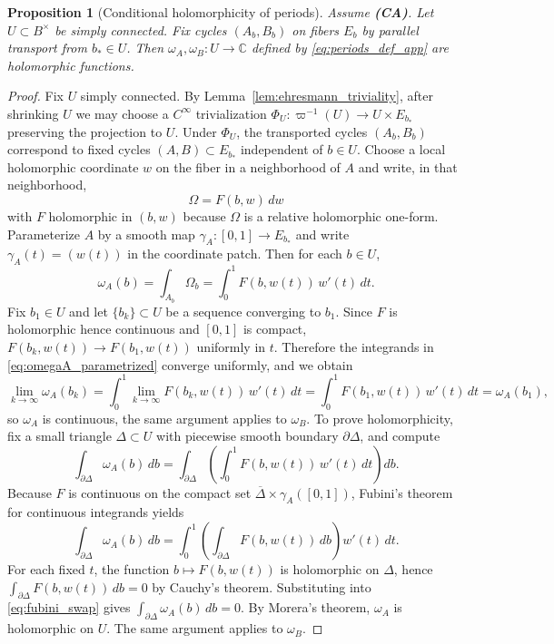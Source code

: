 \documentclass[11pt]{article}
\newtheorem{proposition}[theorem]{Proposition}
\theoremstyle{remark}
\begin{document}
{\begin{proposition}[Conditional holomorphicity of periods]\label{prop:periods_holomorphic}
Assume \textbf{(CA)}. Let $U\subset B^\times$ be simply connected. Fix cycles $(A_b,B_b)$ on fibers $E_b$ by parallel transport from $b_*\in U$. Then $\omega_A,\omega_B:U\to \mathbb{C}$ defined by \eqref{eq:periods_def_app} are holomorphic functions.
\end{proposition}
\begin{proof}
Fix $U$ simply connected. By Lemma~\ref{lem:ehresmann_triviality}, after shrinking $U$ we may choose a $C^\infty$ trivialization $\Phi_U:\varpi^{-1}(U)\to U\times E_{b_*}$ preserving the projection to $U$. Under $\Phi_U$, the transported cycles $(A_b,B_b)$ correspond to fixed cycles $(A,B)\subset E_{b_*}$ independent of $b\in U$. Choose a local holomorphic coordinate $w$ on the fiber in a neighborhood of $A$ and write, in that neighborhood,
\begin{equation}\label{eq:Omega_local_form}
\Omega = F(b,w)\,dw
\end{equation}
with $F$ holomorphic in $(b,w)$ because $\Omega$ is a relative holomorphic one-form. Parameterize $A$ by a smooth map $\gamma_A:[0,1]\to E_{b_*}$ and write $\gamma_A(t)=(w(t))$ in the coordinate patch. Then for each $b\in U$,
\begin{equation}\label{eq:omegaA_parametrized}
\omega_A(b)=\int_{A_b}\Omega_b=\int_{0}^{1} F(b,w(t))\,w'(t)\,dt.
\end{equation}
Fix $b_1\in U$ and let $\{b_k\}\subset U$ be a sequence converging to $b_1$. Since $F$ is holomorphic hence continuous and $[0,1]$ is compact, $F(b_k,w(t))\to F(b_1,w(t))$ uniformly in $t$. Therefore the integrands in \eqref{eq:omegaA_parametrized} converge uniformly, and we obtain
\begin{equation}\label{eq:omegaA_continuity}
\lim_{k\to\infty}\omega_A(b_k)=\int_0^1 \lim_{k\to\infty}F(b_k,w(t))\,w'(t)\,dt=\int_0^1 F(b_1,w(t))\,w'(t)\,dt=\omega_A(b_1),
\end{equation}
so $\omega_A$ is continuous, the same argument applies to $\omega_B$. To prove holomorphicity, fix a small triangle $\Delta\subset U$ with piecewise smooth boundary $\partial\Delta$, and compute
\begin{equation}\label{eq:morera_setup}
\int_{\partial\Delta}\omega_A(b)\,db=\int_{\partial\Delta}\left(\int_0^1 F(b,w(t))\,w'(t)\,dt\right)db.
\end{equation}
Because $F$ is continuous on the compact set $\overline{\Delta}\times \gamma_A([0,1])$, Fubini's theorem for continuous integrands yields
\begin{equation}\label{eq:fubini_swap}
\int_{\partial\Delta}\omega_A(b)\,db=\int_0^1 \left(\int_{\partial\Delta} F(b,w(t))\,db\right) w'(t)\,dt.
\end{equation}
For each fixed $t$, the function $b\mapsto F(b,w(t))$ is holomorphic on $\Delta$, hence $\int_{\partial\Delta}F(b,w(t))\,db=0$ by Cauchy's theorem. Substituting into \eqref{eq:fubini_swap} gives $\int_{\partial\Delta}\omega_A(b)\,db=0$. By Morera's theorem, $\omega_A$ is holomorphic on $U$. The same argument applies to $\omega_B$.
\end{proof}

}
\end{document}

